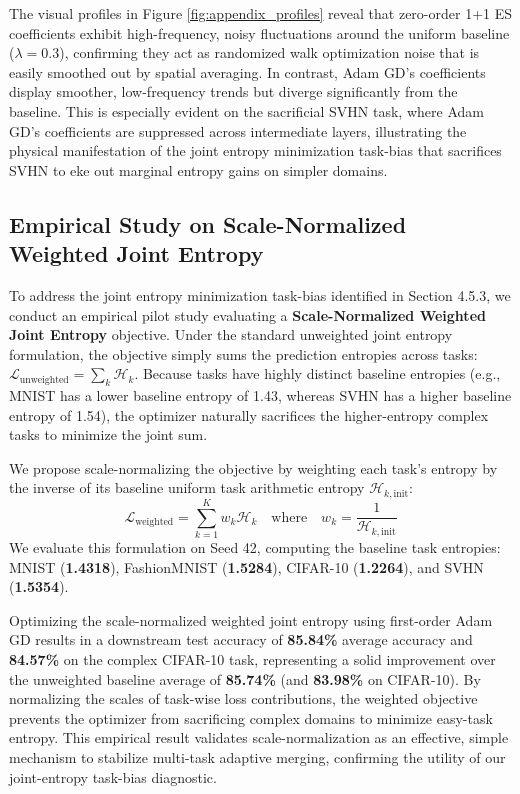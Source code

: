 \documentclass{article}
\theoremstyle{plain}
\theoremstyle{definition}
\theoremstyle{remark}
\begin{document}
The visual profiles in Figure \ref{fig:appendix_profiles} reveal that zero-order 1+1 ES coefficients exhibit high-frequency, noisy fluctuations around the uniform baseline ($\lambda = 0.3$), confirming they act as randomized walk optimization noise that is easily smoothed out by spatial averaging. In contrast, Adam GD's coefficients display smoother, low-frequency trends but diverge significantly from the baseline. This is especially evident on the sacrificial SVHN task, where Adam GD's coefficients are suppressed across intermediate layers, illustrating the physical manifestation of the joint entropy minimization task-bias that sacrifices SVHN to eke out marginal entropy gains on simpler domains.

\subsection{Empirical Study on Scale-Normalized Weighted Joint Entropy}
To address the joint entropy minimization task-bias identified in Section 4.5.3, we conduct an empirical pilot study evaluating a \textbf{Scale-Normalized Weighted Joint Entropy} objective. Under the standard unweighted joint entropy formulation, the objective simply sums the prediction entropies across tasks: $\mathcal{L}_{\text{unweighted}} = \sum_k \mathcal{H}_k$. Because tasks have highly distinct baseline entropies (e.g., MNIST has a lower baseline entropy of 1.43, whereas SVHN has a higher baseline entropy of 1.54), the optimizer naturally sacrifices the higher-entropy complex tasks to minimize the joint sum.

We propose scale-normalizing the objective by weighting each task's entropy by the inverse of its baseline uniform task arithmetic entropy $\mathcal{H}_{k, \text{init}}$:
\begin{equation}
    \mathcal{L}_{\text{weighted}} = \sum_{k=1}^K w_k \mathcal{H}_k \quad \text{where} \quad w_k = \frac{1}{\mathcal{H}_{k, \text{init}}}
\end{equation}
We evaluate this formulation on Seed 42, computing the baseline task entropies: MNIST (\textbf{1.4318}), FashionMNIST (\textbf{1.5284}), CIFAR-10 (\textbf{1.2264}), and SVHN (\textbf{1.5354}).

Optimizing the scale-normalized weighted joint entropy using first-order Adam GD results in a downstream test accuracy of \textbf{85.84\%} average accuracy and \textbf{84.57\%} on the complex CIFAR-10 task, representing a solid improvement over the unweighted baseline average of \textbf{85.74\%} (and \textbf{83.98\%} on CIFAR-10). By normalizing the scales of task-wise loss contributions, the weighted objective prevents the optimizer from sacrificing complex domains to minimize easy-task entropy. This empirical result validates scale-normalization as an effective, simple mechanism to stabilize multi-task adaptive merging, confirming the utility of our joint-entropy task-bias diagnostic.
\end{document}
